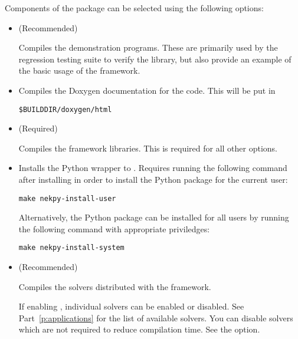 Components of the \nekpp package can be selected using the following options:
\begin{itemize}
    \item {} (Recommended)

    Compiles the demonstration programs. These are primarily used by the
    regression testing suite to verify the \nekpp library, but also provide an
    example of the basic usage of the framework.

    \item {}

    Compiles the Doxygen documentation for the code. This will be put in
    \begin{lstlisting}[style=BashInputStyle]
    $BUILDDIR/doxygen/html
    \end{lstlisting}

    \item {} (Required)

    Compiles the \nekpp framework libraries. This is required for all other
    options.

    \item {}

    Installs the Python wrapper to \nekpp. Requires running the following command 
    after installing \nekpp in order to install the Python package for the 
    current user:
    \begin{lstlisting}[style=BashInputStyle]
    make nekpy-install-user
    \end{lstlisting}

    Alternatively, the Python package can be installed for all users by running
    the following command with appropriate priviledges:
    \begin{lstlisting}[style=BashInputStyle]
    make nekpy-install-system
    \end{lstlisting}

    \item {} (Recommended)

    Compiles the solvers distributed with the \nekpp framework.

    If enabling , individual solvers can be
    enabled or disabled. See Part~\ref{p:applications} for the list of available
    solvers. You can disable solvers which are not required to reduce
    compilation time. See the  option.


\end{itemize}
